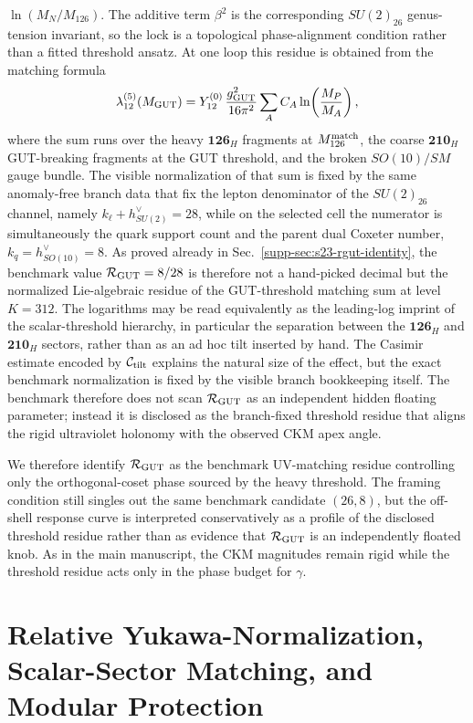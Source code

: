 \documentclass[11pt]{article}
\begin{document}
$\ln(M_N/M_{126})$. The additive term $\beta^2$ is the corresponding
$SU(2)_{26}$ genus-tension invariant, so the lock is a topological phase-alignment condition rather than a fitted threshold ansatz.
At one loop this residue is obtained from the matching formula
\begin{equation}
 \lambda_{12}^{(5)}(M_{\rm GUT})
 =
 Y_{12}^{(0)}\,\frac{g_{\rm GUT}^2}{16\pi^2}
 \sum_A C_A\ln\!\left(\frac{M_P}{M_A}\right),
\end{equation}
where the sum runs over the heavy $\mathbf{126}_H$ fragments at $M_{126}^{\rm match}$, the coarse $\mathbf{210}_H$ GUT-breaking fragments at the GUT threshold, and the broken $SO(10)/SM$ gauge bundle. The visible normalization of that sum is fixed by the same anomaly-free branch data that fix the lepton denominator of the $SU(2)_{26}$ channel, namely $k_{\ell}+h^{\vee}_{SU(2)}=28$, while on the selected cell the numerator is simultaneously the quark support count and the parent dual Coxeter number, $k_q=h^{\vee}_{SO(10)}=8$. As proved already in Sec.~\ref{supp-sec:s23-rgut-identity}, the benchmark value $\mathcal R_{\rm GUT}=8/28$ is therefore not a hand-picked decimal but the normalized Lie-algebraic residue of the GUT-threshold matching sum at level $K=312$. The logarithms may be read equivalently as the leading-log imprint of the scalar-threshold hierarchy, in particular the separation between the $\mathbf{126}_H$ and $\mathbf{210}_H$ sectors, rather than as an ad hoc tilt inserted by hand. The Casimir estimate encoded by $\mathcal C_{\rm tilt}$ explains the natural size of the effect, but the exact benchmark normalization is fixed by the visible branch bookkeeping itself. The benchmark therefore does not scan $\mathcal R_{\rm GUT}$ as an independent hidden floating parameter; instead it is disclosed as the branch-fixed threshold residue that aligns the rigid ultraviolet holonomy with the observed CKM apex angle.

We therefore identify $\mathcal R_{\rm GUT}$ as the benchmark UV-matching residue controlling only the orthogonal-coset phase sourced by the heavy threshold. The framing condition still singles out the same benchmark candidate $(26,8)$, but the off-shell response curve is interpreted conservatively as a profile of the disclosed threshold residue rather than as evidence that $\mathcal R_{\rm GUT}$ is an independently floated knob. As in the main manuscript, the CKM magnitudes remain rigid while the threshold residue acts only in the phase budget for $\gamma$.

\section{Relative Yukawa-Normalization, Scalar-Sector Matching, and Modular Protection}
\end{document}
